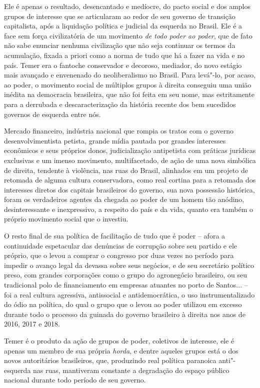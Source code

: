 Ele é apenas o resultado, desencantado e medíocre, do pacto social e dos
amplos grupos de interesse que se articularam ao redor de seu governo de
transição capitalista, após a liquidação política e judicial da esquerda
no Brasil. Ele é a face sem força civilizatória de um movimento \emph{de
todo poder ao poder}, que de fato não sabe enunciar nenhuma civilização
que não seja continuar os termos da acumulação, fixada a priori como a
norma de tudo que há a fazer na vida e no país. Temer era o fantoche
conservador e decoroso, mediador, do novo estágio mais avançado e
envenenado do neoliberalismo no Brasil. Para levá"-lo, por acaso, ao
poder, o movimento social de múltiplos grupos à direita conseguiu uma
união inédita na democracia brasileira, que não foi feita em seu nome,
mas estritamente para a derrubada e descaracterização da história
recente dos bem sucedidos governos de esquerda entre nós.

Mercado financeiro, indústria nacional que rompia os tratos com o
governo desenvolvimentista petista, grande mídia pautada por grandes
interesses econômicos e seus próprios donos, judicialização antipetista
com práticas jurídicas exclusivas e um imenso movimento, multifacetado,
de ação de uma nova simbólica de direita, tendente à violência, nas ruas
do Brasil, alinhados em um projeto de retomada de alguma cultura
conservadora, como real cortina para a retomada dos interesses diretos
dos capitais brasileiros do governo, sua nova possessão histórica, foram
os verdadeiros agentes da chegada ao poder de um homem tão anódino,
desinteressante e inexpressivo, a respeito do país e da vida, quanto era
também o próprio movimento social que o investiu.

O resto final de sua política de facilitação de tudo que é poder --
afora a continuidade espetacular das denúncias de corrupção sobre seu
partido e ele próprio, que o levou a comprar o congresso por duas vezes
no período para impedir o avanço legal da devassa sobre seus negócios, e
de seu secretário político preso, com grandes corporações como o grupo
 do agronegócio brasileiro, ou seu tradicional polo de financiamento
em empresas atuantes no porto de Santos... -- foi a real cultura
agressiva, antissocial e antidemocrática, o uso instrumentalizado do
ódio na política, do qual o grupo que o levou ao poder utilizou em
excesso durante todo o processo da guinada do governo brasileiro à
direita nos anos de 2016, 2017 e 2018.

Temer é o produto da ação de grupos de poder, coletivos de interesse,
ele é apenas um membro de sua própria \emph{horda}, e dentre aqueles
grupos está o dos novos autoritários brasileiros, que, produzindo real
política paranoica anti"-esquerda nas ruas, mantiveram constante a
degradação do espaço público nacional durante todo período de seu
governo.

